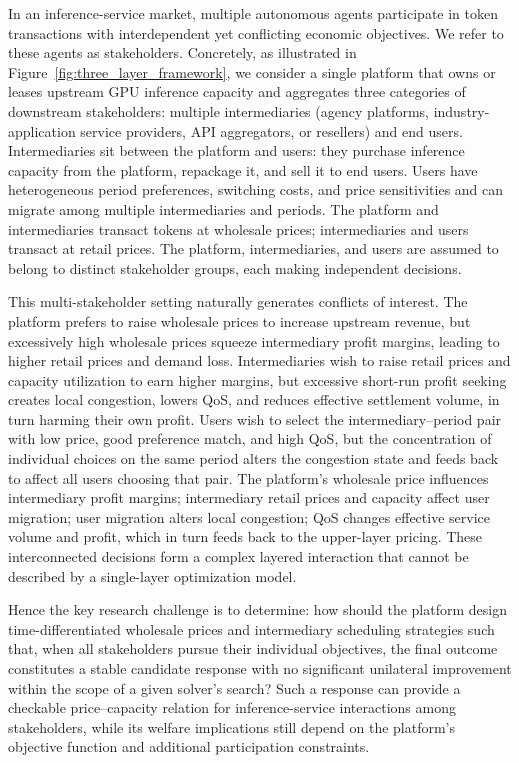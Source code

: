 \documentclass[11pt,a4paper]{article}
\begin{document}
In an inference-service market, multiple autonomous agents participate in token transactions with interdependent yet conflicting economic objectives. We refer to these agents as stakeholders. Concretely, as illustrated in Figure~\ref{fig:three_layer_framework}, we consider a single platform that owns or leases upstream GPU inference capacity and aggregates three categories of downstream stakeholders: multiple intermediaries (agency platforms, industry-application service providers, API aggregators, or resellers) and end users. Intermediaries sit between the platform and users: they purchase inference capacity from the platform, repackage it, and sell it to end users. Users have heterogeneous period preferences, switching costs, and price sensitivities and can migrate among multiple intermediaries and periods. The platform and intermediaries transact tokens at wholesale prices; intermediaries and users transact at retail prices. The platform, intermediaries, and users are assumed to belong to distinct stakeholder groups, each making independent decisions.

This multi-stakeholder setting naturally generates conflicts of interest. The platform prefers to raise wholesale prices to increase upstream revenue, but excessively high wholesale prices squeeze intermediary profit margins, leading to higher retail prices and demand loss. Intermediaries wish to raise retail prices and capacity utilization to earn higher margins, but excessive short-run profit seeking creates local congestion, lowers QoS, and reduces effective settlement volume, in turn harming their own profit. Users wish to select the intermediary--period pair with low price, good preference match, and high QoS, but the concentration of individual choices on the same period alters the congestion state and feeds back to affect all users choosing that pair. The platform's wholesale price influences intermediary profit margins; intermediary retail prices and capacity affect user migration; user migration alters local congestion; QoS changes effective service volume and profit, which in turn feeds back to the upper-layer pricing. These interconnected decisions form a complex layered interaction that cannot be described by a single-layer optimization model.

Hence the key research challenge is to determine: how should the platform design time-differentiated wholesale prices and intermediary scheduling strategies such that, when all stakeholders pursue their individual objectives, the final outcome constitutes a stable candidate response with no significant unilateral improvement within the scope of a given solver's search? Such a response can provide a checkable price--capacity relation for inference-service interactions among stakeholders, while its welfare implications still depend on the platform's objective function and additional participation constraints.
\end{document}
